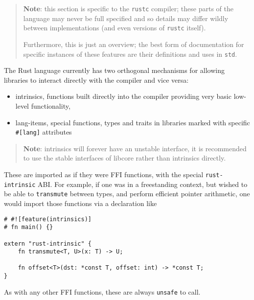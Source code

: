 \documentclass[]{article}
\begin{document}
\begin{quote}
\textbf{Note}: this section is specific to the \texttt{rustc} compiler;
these parts of the language may never be full specified and so details
may differ wildly between implementations (and even versions of
\texttt{rustc} itself).

Furthermore, this is just an overview; the best form of documentation
for specific instances of these features are their definitions and uses
in \texttt{std}.
\end{quote}

The Rust language currently has two orthogonal mechanisms for allowing
libraries to interact directly with the compiler and vice versa:

\begin{itemize}
\itemsep1pt\parskip0pt
\item
  intrinsics, functions built directly into the compiler providing very
  basic low-level functionality,
\item
  lang-items, special functions, types and traits in libraries marked
  with specific \texttt{\#{[}lang{]}} attributes
\end{itemize}


\begin{quote}
\textbf{Note}: intrinsics will forever have an unstable interface, it is
recommended to use the stable interfaces of libcore rather than
intrinsics directly.
\end{quote}

These are imported as if they were FFI functions, with the special
\texttt{rust-intrinsic} ABI. For example, if one was in a freestanding
context, but wished to be able to \texttt{transmute} between types, and
perform efficient pointer arithmetic, one would import those functions
via a declaration like

\begin{verbatim}
# #![feature(intrinsics)]
# fn main() {}

extern "rust-intrinsic" {
    fn transmute<T, U>(x: T) -> U;

    fn offset<T>(dst: *const T, offset: int) -> *const T;
}
\end{verbatim}

As with any other FFI functions, these are always \texttt{unsafe} to
call.
\end{document}
